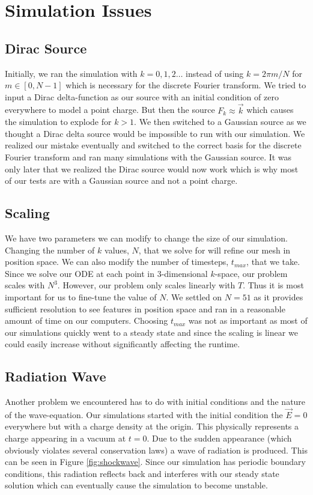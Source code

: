 \documentclass{article}
\begin{document}
	\section{Simulation Issues}
	
	\subsection{Dirac Source}
	Initially, we ran the simulation with $k=0,1,2\dots$ instead of using $k=2\pi m/N$ for $m \in [0,N-1]$ which is necessary for the discrete Fourier transform. We tried to input a Dirac delta-function as our source with an initial condition of zero everywhere to model a point charge. But then the source $F_k \approx \vec{k}$ which causes the simulation to explode for $k>1$. We then switched to a Gaussian source as we thought a Dirac delta source would be impossible to run with our simulation. We realized our mistake eventually and switched to the correct basis for the discrete Fourier transform and ran many simulations with the Gaussian source. It was only later that we realized the Dirac source would now work which is why most of our tests are with a Gaussian source and not a point charge.
	
	\subsection{Scaling}
	We have two parameters we can modify to change the size of our simulation. Changing the number of $k$ values, $N$, that we solve for will refine our mesh in position space. We can also modify the number of timesteps, $t_{max}$, that we take. Since we solve our ODE at each point in 3-dimensional $k$-space, our problem scales with $N^3$. However, our problem only scales linearly with $T$. Thus it is most important for us to fine-tune the value of $N$. We settled on $N=51$ as it provides sufficient resolution to see features in position space and ran in a reasonable amount of time on our computers. Choosing $t_{max}$ was not as important as most of our simulations quickly went to a steady state and since the scaling is linear we could easily increase without significantly affecting the runtime.
	
	\subsection{Radiation Wave}
	Another problem we encountered has to do with initial conditions and the nature of the wave-equation. Our simulations started with the initial condition the $\vec E=0$ everywhere but with a charge density at the origin. This physically represents a charge appearing in a vacuum at $t=0$. Due to the sudden appearance (which obviously violates several conservation laws) a wave of radiation is produced. This can be seen in Figure \ref{fig:shockwave}. Since our simulation has periodic boundary conditions, this radiation reflects back and interferes with our steady state solution which can eventually cause the simulation to become unstable. 
	
\end{document}
